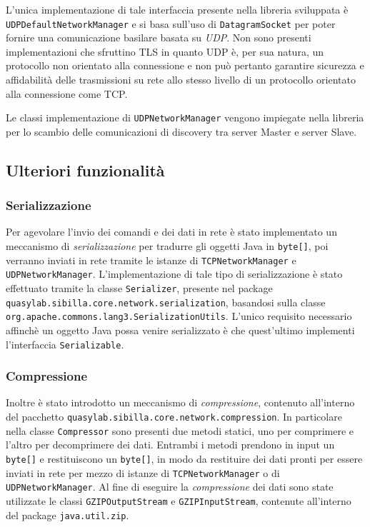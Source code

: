 L'unica implementazione di tale interfaccia presente nella libreria sviluppata è \texttt{UDPDefaultNetworkManager} e si basa sull'uso di \texttt{DatagramSocket} per poter fornire una comunicazione basilare basata su \emph{UDP}.
Non sono presenti implementazioni che sfruttino TLS in quanto UDP è, per sua natura, un protocollo non orientato alla connessione e non può pertanto garantire sicurezza e affidabilità delle trasmissioni su rete allo stesso livello di un protocollo orientato alla connessione come TCP.

Le classi implementazione di \texttt{UDPNetworkManager} vengono impiegate nella libreria per lo scambio delle comunicazioni di discovery tra server Master e server Slave.


\subsection{Ulteriori funzionalità}

\subsubsection{Serializzazione}

Per agevolare l'invio dei comandi e dei dati in rete è stato implementato un meccanismo di \emph{serializzazione} per tradurre gli oggetti Java in \texttt{byte[]}, poi verranno inviati in rete tramite le istanze di \texttt{TCPNetworkManager} e \texttt{UDPNetworkManager}. 
L'implementazione di tale tipo di serializzazione è stato effettuato tramite la classe \texttt{Serializer}, presente nel package \texttt{quasylab.sibilla.core.network.serialization}, basandosi sulla classe \texttt{org.apache.commons.lang3.SerializationUtils}.
L'unico requisito necessario affinchè un oggetto Java possa venire serializzato è che quest'ultimo implementi l'interfaccia \texttt{Serializable}.

\subsubsection{Compressione}

Inoltre è stato introdotto un meccanismo di \emph{compressione}, contenuto all'interno del pacchetto \texttt{quasylab.sibilla.core.network.compression}. In particolare nella classe \texttt{Compressor} sono presenti due metodi statici, uno per comprimere e l'altro per decomprimere dei dati. Entrambi i metodi prendono in input un \texttt{byte[]} e restituiscono un \texttt{byte[]}, in modo da restituire dei dati pronti per essere inviati in rete per mezzo di istanze di \texttt{TCPNetworkManager} o di \texttt{UDPNetworkManager}. Al fine di eseguire la \emph{compressione} dei dati sono state utilizzate le classi \texttt{GZIPOutputStream} e \texttt{GZIPInputStream}, contenute all'interno del package \texttt{java.util.zip}.

